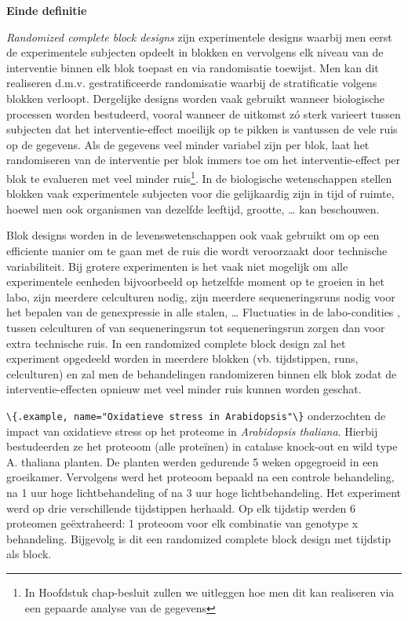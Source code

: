 \documentclass[
  12pt,dutch,coursenotes]{book}
\newcommand{\passthrough}[1]{#1}
\begin{document}
\textbf{Einde definitie}

\emph{Randomized complete block designs} zijn experimentele designs waarbij men eerst de experimentele subjecten opdeelt in blokken en vervolgens elk niveau van de interventie binnen elk blok toepast en via randomisatie toewijst. Men kan dit realiseren d.m.v. gestratificeerde randomisatie waarbij de stratificatie volgens blokken verloopt. Dergelijke designs worden vaak gebruikt wanneer biologische processen worden bestudeerd, vooral wanneer de uitkomst zó sterk varieert tussen subjecten dat het interventie-effect moeilijk op te pikken is vantussen de vele ruis op de gegevens. Als de gegevens veel minder variabel zijn per blok, laat het randomiseren van de interventie per blok immers toe om het interventie-effect per blok te evalueren met veel minder ruis\footnote{In Hoofdstuk chap-besluit zullen we uitleggen hoe men dit kan realiseren via een gepaarde analyse van de gegevens}. In de biologische wetenschappen stellen blokken vaak experimentele subjecten voor die gelijkaardig zijn in tijd of ruimte, hoewel men ook organismen van dezelfde leeftijd, grootte, \ldots{} kan beschouwen.

Blok designs worden in de levenswetenschappen ook vaak gebruikt om op een efficiente manier om te gaan met de ruis die wordt veroorzaakt door technische variabiliteit. Bij grotere experimenten is het vaak niet mogelijk om alle experimentele eenheden bijvoorbeeld op hetzelfde moment op te groeien in het labo, zijn meerdere celculturen nodig, zijn meerdere sequeneringsruns nodig voor het bepalen van de genexpressie in alle stalen, \ldots{} Fluctuaties in de labo-condities , tussen celculturen of van sequeneringsrun tot sequeneringsrun zorgen dan voor extra technische ruis. In een randomized complete block design zal het experiment opgedeeld worden in meerdere blokken (vb. tijdstippen, runs, celculturen) en zal men de behandelingen randomizeren binnen elk blok zodat de interventie-effecten opnieuw met veel minder ruis kunnen worden geschat.

\passthrough{\lstinline!\{.example, name="Oxidatieve stress in Arabidopsis"\}!}
\citet{Jacques2015} onderzochten de impact van oxidatieve stress op het proteome in \emph{Arabidopsis thaliana}. Hierbij bestudeerden ze het proteoom (alle proteïnen) in catalase knock-out en wild type A. thaliana planten. De planten werden gedurende 5 weken opgegroeid in een groeikamer. Vervolgens werd het proteoom bepaald na een controle behandeling, na 1 uur hoge lichtbehandeling of na 3 uur hoge lichtbehandeling. Het experiment werd op drie verschillende tijdstippen herhaald. Op elk tijdstip werden 6 proteomen geëxtraheerd: 1 proteoom voor elk combinatie van genotype x behandeling. Bijgevolg is dit een randomized complete block design met tijdstip als block.
\end{document}
